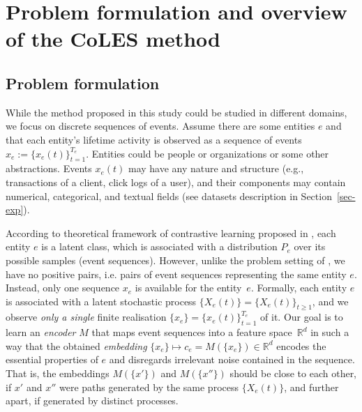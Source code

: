 \documentclass[sigconf]{acmart}
\newcommand{\R}{\mathbb{R}}
\begin{document}

\section{Problem formulation and overview of the CoLES method} \label{sec-method}

\subsection{Problem formulation} \label{sec:problem setting}

While the method proposed in this study could be studied in different domains, we focus on discrete
sequences of events. Assume there are some entities $e$ and that each entity's lifetime activity is
observed as a sequence of events $
    x_e := \{x_e(t)\}^{T_e}_{t=1}
$. Entities could be people or organizations or some other abstractions. Events $x_e(t)$ may have
any nature and structure (e.g., transactions of a client, click logs of a user), and their components
may contain numerical, categorical, and textual fields (see datasets description in Section~\ref{sec-exp}). 

According to theoretical framework of contrastive learning proposed in \citep{Saunshi2019ICML}, each
entity $e$ is a latent class, which is associated with a distribution $P_e$ over its possible samples
(event sequences). However, unlike the problem setting of \cite{Saunshi2019ICML}, we have no positive
pairs, i.e. pairs of event sequences representing the same entity $e$. Instead, only one sequence
$x_e$ is available for the entity~$e$. Formally, each entity $e$ is associated with a latent stochastic
process $
    \{X_e(t)\} = \{X_e(t)\}_{t\geq 1}
$, and we observe \emph{only a single} finite realisation $
    \{x_e\} = \{x_e(t)\}_{t=1}^{T_e}
$ of it. Our goal is to learn an \emph{encoder} $M$ that maps event sequences into a feature space~$\R^d$
in such a way that the obtained \emph{embedding} $
    \{x_e\} \mapsto c_e = M(\{x_e\}) \in \R^d
$ encodes the essential properties of $e$ and disregards irrelevant noise contained in the sequence.
That is, the embeddings $M(\{x'\})$ and $M(\{x''\})$ should be close to each other, if $x'$ and
$x''$ were paths generated by the same process $\{X_e(t)\}$, and further apart, if generated by distinct
processes.
\end{document}
